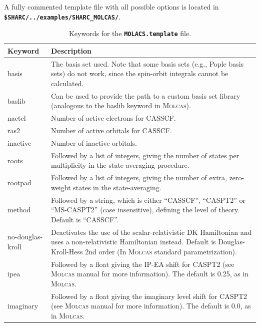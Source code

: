 \documentclass[a4paper,10pt,DIV=15,openany]{scrbook}
\newcommand{\ttt}[1]{\textbf{\texttt{#1}}}
\begin{document}
A fully commented template file with all possible options is located in \ttt{\$SHARC/../examples/SHARC\_MOLCAS/}.

\begin{table}
  \centering
  \caption{Keywords for the \ttt{MOLACS.template} file.}
  \label{tab:molcas_temp}
  \begin{tabular}{>{\ttfamily}lp{12cm}}
  \hline
  Keyword       &Description\\
  \hline
basis           &The basis set used. Note that some basis sets (e.g., Pople basis sets) do not work, since the spin-orbit integrals cannot be calculated.\\
baslib          &Can be used to provide the path to a custom basis set library (analogous to the baslib keyword in \textsc{Molcas}).\\
nactel          &Number of active electrons for CASSCF.\\
ras2            &Number of active orbitals for CASSCF.\\
inactive        &Number of inactive orbitals.\\
roots           &Followed by a list of integers, giving the number of states per multiplicity in the state-averaging procedure.\\
rootpad         &Followed by a list of integers, giving the number of extra, zero-weight states in the state-averaging.\\
method          &Followed by a string, which is either ``CASSCF'', ``CASPT2'' or ``MS-CASPT2'' (case insensitive), defining the level of theory. Default is ``CASSCF''.\\
no-douglas-kroll&Deactivates the use of the scalar-relativistic DK Hamiltonian and uses a non-relativistic Hamiltonian instead. Default is Douglas-Kroll-Hess 2nd order  (In \textsc{Molcas} standard parametrization).\\
ipea            &Followed by a float giving the IP-EA shift for CASPT2 (see \textsc{Molcas} manual for more information). The default is 0.25, as in \textsc{Molcas}.\\
imaginary       &Followed by a float giving the imaginary level shift for CASPT2 (see \textsc{Molcas} manual for more information). The default is 0.0, as in \textsc{Molcas}.\\

\end{tabular}
\end{table}
\end{document}
